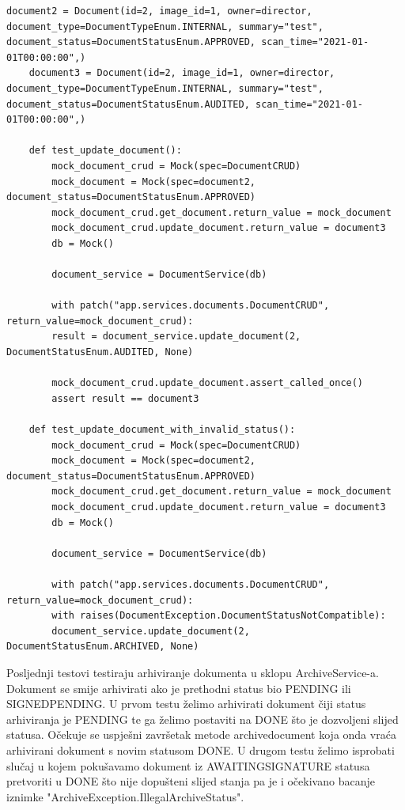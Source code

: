 \begin{lstlisting}[style=pythonstyle]
	document2 = Document(id=2, image_id=1, owner=director, document_type=DocumentTypeEnum.INTERNAL, summary="test", document_status=DocumentStatusEnum.APPROVED, scan_time="2021-01-01T00:00:00",)
	document3 = Document(id=2, image_id=1, owner=director, document_type=DocumentTypeEnum.INTERNAL, summary="test", document_status=DocumentStatusEnum.AUDITED, scan_time="2021-01-01T00:00:00",)	

	def test_update_document():
		mock_document_crud = Mock(spec=DocumentCRUD)
		mock_document = Mock(spec=document2, document_status=DocumentStatusEnum.APPROVED)
		mock_document_crud.get_document.return_value = mock_document
		mock_document_crud.update_document.return_value = document3
		db = Mock()
		
		document_service = DocumentService(db)
		
		with patch("app.services.documents.DocumentCRUD", return_value=mock_document_crud):
		result = document_service.update_document(2, DocumentStatusEnum.AUDITED, None)
		
		mock_document_crud.update_document.assert_called_once()
		assert result == document3
	
	def test_update_document_with_invalid_status():
		mock_document_crud = Mock(spec=DocumentCRUD)
		mock_document = Mock(spec=document2, document_status=DocumentStatusEnum.APPROVED)
		mock_document_crud.get_document.return_value = mock_document
		mock_document_crud.update_document.return_value = document3
		db = Mock()
		
		document_service = DocumentService(db)
		
		with patch("app.services.documents.DocumentCRUD", return_value=mock_document_crud):
		with raises(DocumentException.DocumentStatusNotCompatible):
		document_service.update_document(2, DocumentStatusEnum.ARCHIVED, None)
\end{lstlisting}

			{Posljednji testovi testiraju arhiviranje dokumenta u sklopu ArchiveService-a. Dokument se smije arhivirati ako je prethodni status bio PENDING ili SIGNED\textunderscore PENDING. U prvom testu želimo arhivirati dokument čiji status arhiviranja je PENDING te ga želimo postaviti na DONE što je dozvoljeni slijed statusa. Očekuje se uspješni završetak metode archive\textunderscore document koja onda vraća arhivirani dokument s novim statusom DONE.
			U drugom testu želimo isprobati slučaj u kojem pokušavamo dokument iz AWAITING\textunderscore SIGNATURE statusa pretvoriti u DONE što nije dopušteni slijed stanja pa je i očekivano bacanje iznimke "ArchiveException.IllegalArchiveStatus".}
			
